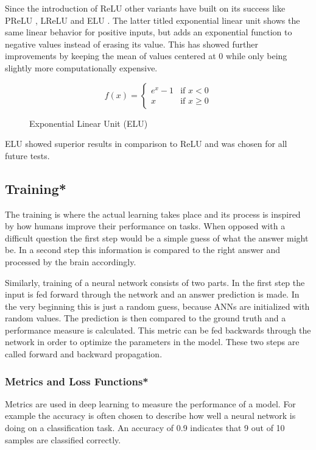 Since the introduction of ReLU other variants have built on its success like PReLU \cite{He2015}, LReLU and ELU \cite{Clevert2015}. The latter titled exponential linear unit shows the same linear behavior for positive inputs, but adds an exponential function to negative values instead of erasing its value.  This has showed further improvements by keeping the mean of values centered at 0 while only being slightly more computationally expensive.

\begin{figure}[H]
\[
f(x) =
\begin{cases} 
e^x - 1 & \text{if } x < 0  \\
x & \text{if } x \geq 0
\end{cases}
\]
\caption{Exponential Linear Unit (ELU)}
\end{figure}

ELU showed superior results in comparison to ReLU and was chosen for all future tests.

\subsection{Training*}

The training is where the actual learning takes place and its process is inspired by how humans improve their performance on tasks. When opposed with a difficult question the first step would be a simple guess of what the answer might be. In a second step this information is compared to the right answer and processed by the brain accordingly.

Similarly, training of a neural network consists of two parts. In the first step the input is fed forward through the network and an answer prediction is made. In the very beginning this is just a random guess, because ANNs are initialized with random values. The prediction is then compared to the ground truth and a performance measure is calculated. This metric can be fed backwards through the network in order to optimize the parameters in the model. These two steps are called forward and backward propagation.

\subsubsection{Metrics and Loss Functions*}

Metrics are used in deep learning to measure the performance of a model. For example the accuracy is often chosen to describe how well a neural network is doing on a classification task. An accuracy of 0.9 indicates that 9 out of 10 samples are classified correctly.

